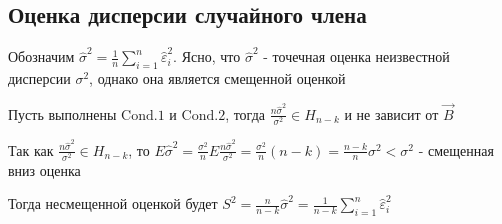 \documentclass[12pt]{article}
\begin{document}
\subsection{Оценка дисперсии случайного члена}

Обозначим $\hat \sigma^2 = \frac{1}{n} \sum_{i = 1}^n \hat \varepsilon^2_i$. Ясно, что $\hat \sigma^2$ - точечная оценка 
неизвестной дисперсии $\sigma^2$, однако она является смещенной оценкой

\begin{MyTheorem}
    Пусть выполнены $\mathrm{Cond. 1}$ и $\mathrm{Cond. 2}$, тогда $\frac{n \hat \sigma^2}{\sigma^2} \in H_{n - k}$ и не зависит от $\vec B$
\end{MyTheorem}

Так как $\frac{n \hat \sigma^2}{\sigma^2} \in H_{n - k}$, то $E \hat \sigma^2 = \frac{\sigma^2}{n} E \frac{n \hat \sigma^2}{\sigma^2} = \frac{\sigma^2}{n} (n - k) = \frac{n - k}{n} \sigma^2 < \sigma^2$ - смещенная вниз оценка

Тогда несмещенной оценкой будет $S^2 = \frac{n}{n - k} \hat \sigma^2 = \frac{1}{n - k} \sum_{i = 1}^n \hat \varepsilon_i^2$

%
\end{document}
